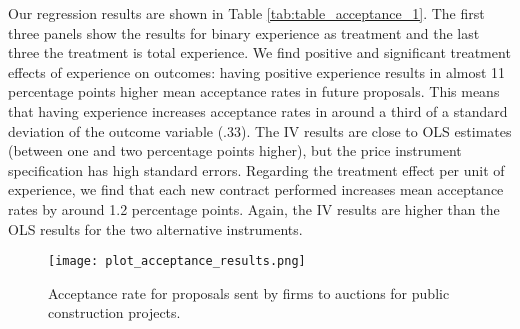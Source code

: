 Our regression results are shown in Table \ref{tab:table_acceptance_1}. The first three panels show the results for binary experience as treatment and the last three the treatment is total experience. We find positive and significant treatment effects of experience on outcomes: having positive experience results in almost 11 percentage points higher mean acceptance rates in future proposals. This means that having experience increases acceptance rates in around a third of a standard deviation of the outcome variable (.33). The IV results are close to OLS estimates (between one and two percentage points higher), but the price instrument specification has high standard errors. Regarding the treatment effect per unit of experience, we find that each new contract performed increases mean acceptance rates by around 1.2 percentage points. Again, the IV results are higher than the OLS results for the two alternative instruments.
 \clearpage
\begin{figure}
\centering
  \texttt{[image: plot\_acceptance\_results.png]}
  \caption{Acceptance rate for proposals sent by firms to auctions for public construction projects.}
  \label{fig:plot_acceptance_results}
\end{figure}



